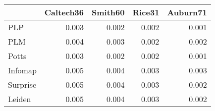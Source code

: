\begin{tabular}{lrrrr}
\toprule
{} & Caltech36 & Smith60 & Rice31 & Auburn71 \\
\midrule
PLP      &     0.003 &   0.002 &  0.002 &    0.001 \\
PLM      &     0.004 &   0.003 &  0.002 &    0.002 \\
Potts    &     0.003 &   0.002 &  0.002 &    0.001 \\
Infomap  &     0.005 &   0.004 &  0.003 &    0.003 \\
Surprise &     0.005 &   0.004 &  0.003 &    0.002 \\
Leiden   &     0.005 &   0.004 &  0.003 &    0.002 \\
\bottomrule
\end{tabular}
